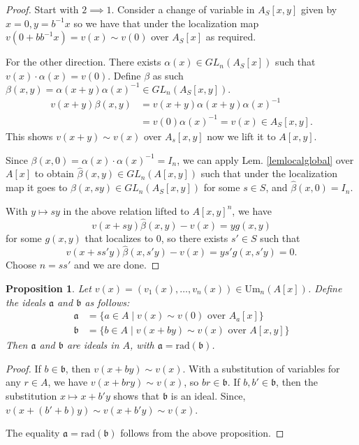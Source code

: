 \documentclass[12pt]{article}
\numberwithin{equation}{section}
\newcounter{dummy} \numberwithin{dummy}{section}
\newtheorem{proposition}[dummy]{Proposition}
\begin{document}
	\begin{proof}
	Start with $2 \implies 1$. Consider a change of variable in $A_S[x,y]$ given by $x=0, y=b^{-1}x$ so we have that under the localization map $v(0+b b^{-1}x ) = v(x) \sim v(0) $ over $A_S[x]$ as required.
	
	For the other direction.
	There exists \( \alpha(x) \in GL_n(A_S[x]) \) such that \( v(x) \cdot \alpha(x) = v(0) \). Define $\beta$ as such  
	\(
	\beta(x, y) = \alpha(x + y) \alpha(x)^{-1} \in GL_n(A_S[x, y]).
	\)
	\begin{align*}
			v(x + y)  \beta(x, y) &= v(x + y)  \alpha(x + y)  \alpha(x)^{-1}\\
			&=v(0) \alpha(x)^{-1} = v(x) \in A_S[x,y].
	\end{align*}
	This shows $v(x+y) \sim v(x) $ over $A_s[x,y]$ now we lift it to $A[x,y]$.
	
	Since \( \beta(x, 0) = \alpha(x) \cdot \alpha(x)^{-1} = I_n \), we can apply Lem. \ref{lemlocalglobal} over \( A[x] \) to obtain \( \hat{\beta}(x, y) \in GL_n(A[x, y]) \) such that under the localization map it goes to \( \beta(x, sy) \in GL_n(A_S[x,y])\) for some \( s \in S \), and \( \hat{\beta}(x, 0) = I_n \). 
	
	With $y\mapsto sy$ in the above relation lifted to \( A[x, y]^n \), we have  
	\[
	v(x + sy)  \hat{\beta}(x, y) - v(x) = y  g(x, y)
	\]
	for some \( g(x, y) \) that localizes to 0, so there exists \( s' \in S \) such that 
	\[
	v(x + ss'y) \hat{\beta}(x, s'y) - v(x) = y  s' g(x, s'y) = 0.
	\]
	Choose $n=ss' $ and we are done.
	\end{proof}
		
	\begin{proposition}
		Let $v(x) = (v_1(x), \dots, v_n(x)) \in \mathrm{Um}_n(A[x])$. Define the ideals $\mathfrak{a}$ and $\mathfrak{b}$ as follows:
		\begin{align*} \mathfrak{a} &= \{a \in A \mid v(x) \sim v(0) \text{ over } A_a[x] \} \\ \mathfrak{b} &= \{b \in A \mid v(x + by) \sim v(x) \text{ over } A[x, y] \} \end{align*} 
		Then $\mathfrak{a}$ and $\mathfrak{b}$ are ideals in $A$, with $\mathfrak{a} = \text{rad}(\mathfrak{b})$.
	\end{proposition}
	
	\begin{proof}
		If $b \in \mathfrak{b}$, then $v(x + by) \sim v(x)$.  With a substitution of variables for any $r \in A$, we have $v(x +bry) \sim v(x)$, so $br \in \mathfrak{b}$.  If $b, b' \in \mathfrak{b}$, then the substitution $x \mapsto x+b'y$ shows that $\mathfrak{b}$ is an ideal. Since, $ v(x+(b'+b)y) \sim v(x+b'y) \sim v(x)$.
		
		 The equality $\mathfrak{a} = \text{rad}(\mathfrak{b})$ follows from the above proposition.
	\end{proof}
	
\end{document}
